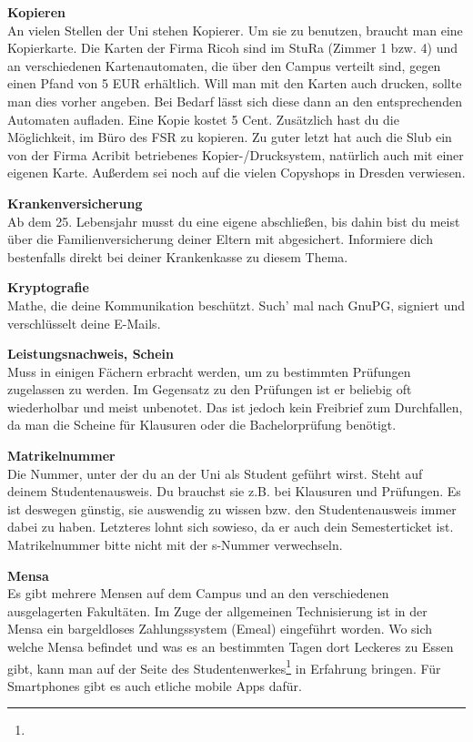 \textbf{Kopieren} \\
An vielen Stellen der Uni stehen Kopierer.
Um sie zu benutzen, braucht man eine Kopierkarte.
Die Karten der Firma Ricoh sind im StuRa (Zimmer 1 bzw. 4) und an verschiedenen Kartenautomaten, die über den Campus verteilt sind, gegen einen Pfand von 5 EUR erhältlich.
Will man mit den Karten auch drucken, sollte man dies vorher angeben.
Bei Bedarf lässt sich diese dann an den entsprechenden Automaten aufladen.
Eine Kopie kostet 5 Cent.
Zusätzlich hast du die Möglichkeit, im Büro des FSR zu kopieren.
Zu guter letzt hat auch die Slub ein von der Firma Acribit betriebenes Kopier-/Drucksystem, natürlich auch mit einer eigenen Karte.
Außerdem sei noch auf die vielen Copyshops in Dresden verwiesen.

\textbf{Krankenversicherung} \\
Ab dem 25. Lebensjahr musst du eine eigene abschließen, bis dahin bist du meist über die Familienversicherung deiner Eltern mit abgesichert.
Informiere dich bestenfalls direkt bei deiner Krankenkasse zu diesem Thema.

\textbf{Kryptografie} \\
Mathe, die deine Kommunikation beschützt.
Such' mal nach GnuPG, signiert und verschlüsselt deine E-Mails.

\textbf{Leistungsnachweis, Schein} \\
Muss in einigen Fächern erbracht werden, um zu bestimmten Prüfungen zugelassen zu werden.
Im Gegensatz zu den Prüfungen ist er beliebig oft wiederholbar und meist unbenotet.
Das ist jedoch kein Freibrief zum Durchfallen, da man die Scheine für Klausuren oder die Bachelorprüfung benötigt.

\textbf{Matrikelnummer} \\
Die Nummer, unter der du an der Uni als Student geführt wirst.
Steht auf deinem Studentenausweis.
Du brauchst sie z.B. bei Klausuren und Prüfungen.
Es ist deswegen günstig, sie auswendig zu wissen bzw. den Studentenausweis immer dabei zu haben.
Letzteres lohnt sich sowieso, da er auch dein Semesterticket ist.
Matrikelnummer bitte nicht mit der s-Nummer verwechseln.

\textbf{Mensa} \\
Es gibt mehrere Mensen auf dem Campus und an den verschiedenen ausgelagerten Fakultäten.
Im Zuge der allgemeinen Technisierung ist in der Mensa ein bargeldloses Zahlungssystem (Emeal) eingeführt worden.
Wo sich welche Mensa befindet und was es an bestimmten Tagen dort Leckeres zu Essen gibt, kann man auf der Seite des Studentenwerkes\footnote{} in Erfahrung bringen.
Für Smartphones gibt es auch etliche mobile Apps dafür.

